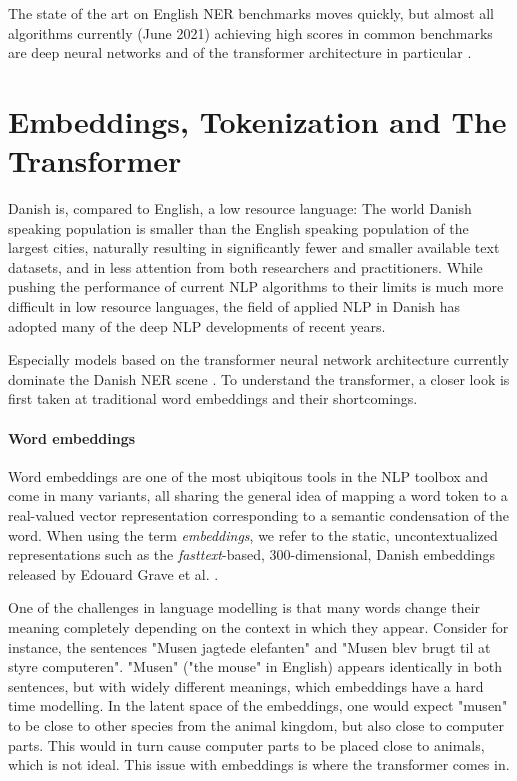 \documentclass[main.tex]{subfiles}
\begin{document}
The state of the art on English NER benchmarks moves quickly, but almost all algorithms currently (June 2021) achieving high scores in common benchmarks are deep neural networks and of the transformer architecture in particular \cite{ruder21ner, pwc21ner}.

\section{Embeddings, Tokenization and The Transformer}
\label{sec:transformers}
Danish is, compared to English, a low resource language:
The world Danish speaking population is smaller than the English speaking population of the largest cities, naturally resulting in significantly fewer and smaller available text datasets, and in less attention from both researchers and practitioners.
While pushing the performance of current NLP algorithms to their limits is much more difficult in low resource languages, the field of applied NLP in Danish has adopted many of the deep NLP developments of recent years.

Especially models based on the transformer neural network architecture \cite{vaswani2017att} currently dominate the Danish NER scene \cite{danlp2021}.
To understand the transformer, a closer look is first taken at traditional word embeddings and their shortcomings.

\paragraph{Word embeddings}
Word embeddings are one of the most ubiqitous tools in the NLP toolbox and come in many variants, all sharing the general idea of mapping a word token to a real-valued vector representation corresponding to a semantic condensation of the word.
When using the term \emph{embeddings}, we refer to the static, uncontextualized representations such as the \emph{fasttext}-based, 300-dimensional, Danish embeddings released by Edouard Grave et al. \cite{grave2018learning}.

One of the challenges in language modelling is that many words change their meaning completely depending on the context in which they appear.
Consider for instance, the sentences "Musen jagtede elefanten" and "Musen blev brugt til at styre computeren".
"Musen" ("the mouse" in English) appears identically in both sentences, but with widely different meanings, which embeddings have a hard time modelling.
In the latent space of the embeddings, one would expect "musen" to be close to other species from the animal kingdom, but also close to computer parts.
This would in turn cause computer parts to be placed close to animals, which is not ideal.
This issue with embeddings is where the transformer comes in.
\end{document}
